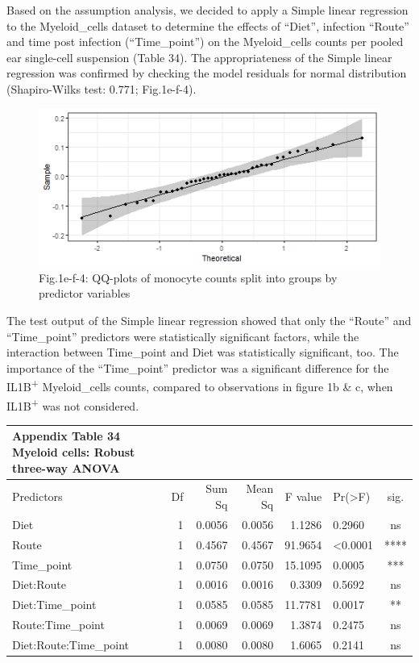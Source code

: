 \documentclass[
  12pt,
  letterpaper,
]{article}
\begin{document}
Based on the assumption analysis, we decided to apply a Simple linear regression to the Myeloid\_cells dataset to determine the effects of ``Diet'', infection ``Route'' and time post infection (``Time\_point'') on the Myeloid\_cells counts per pooled ear single-cell suspension (Table 34). The appropriateness of the Simple linear regression was confirmed by checking the model residuals for normal distribution (Shapiro-Wilks test: 0.771; Fig.1e-f-4).

\begin{figure}[H]

{\centering \includegraphics[width=0.95\linewidth,]{Statistics_report_files/figure-latex/qq-plot-figure-1e-f-myeloid-cell-residuals-1} 

}

\caption{Fig.1e-f-4: QQ-plots of monocyte counts split into groups by predictor variables}\label{fig:qq-plot-figure-1e-f-myeloid-cell-residuals}
\end{figure}

The test output of the Simple linear regression showed that only the ``Route'' and ``Time\_point'' predictors were statistically significant factors, while the interaction between Time\_point and Diet was statistically significant, too. The importance of the ``Time\_point'' predictor was a significant difference for the IL1B\textsuperscript{+} Myeloid\_cells counts, compared to observations in figure 1b \& c, when IL1B\textsuperscript{+} was not considered.

\begin{longtable}{l|rrrrlc}
\caption*{
{\large \textbf{Appendix Table 34}} \\ 
{\small \textbf{Myeloid cells: Robust three-way ANOVA}}
} \\ 
\toprule
\multicolumn{1}{l}{Predictors} & Df & Sum Sq & Mean Sq & F value & Pr(>F) & sig. \\ 
\midrule\addlinespace[2.5pt]
Diet & 1 & 0.0056 & 0.0056 & 1.1286 & 0.2960 & ns \\ 
Route & 1 & 0.4567 & 0.4567 & 91.9654 & <0.0001 & **** \\ 
Time\_point & 1 & 0.0750 & 0.0750 & 15.1095 & 0.0005 & *** \\ 
Diet:Route & 1 & 0.0016 & 0.0016 & 0.3309 & 0.5692 & ns \\ 
Diet:Time\_point & 1 & 0.0585 & 0.0585 & 11.7781 & 0.0017 & ** \\ 
Route:Time\_point & 1 & 0.0069 & 0.0069 & 1.3874 & 0.2475 & ns \\ 
Diet:Route:Time\_point & 1 & 0.0080 & 0.0080 & 1.6065 & 0.2141 & ns \\ 
\bottomrule
\end{longtable}
\end{document}
